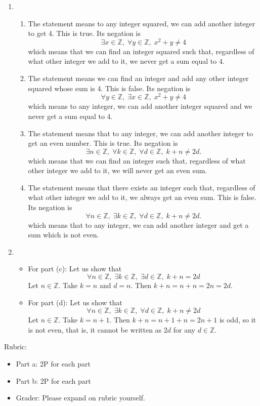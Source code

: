 \documentclass{article}
\newcommand{\Z}{\mathbb{Z}}
\theoremstyle{definition}
\begin{document}
\begin{solution}
\begin{enumerate}
	\item 
	\begin{enumerate}
		\item The statement means to any integer squared, we can add another integer to get 4. This is true. Its negation is
		\[
		\exists x \in \Z, \; \forall y \in \Z, \; x^2 + y \neq 4
		\]
		which means that we can find an integer squared such that, regardless of what other integer we add to it, we never get a sum equal to 4. 
		
		\item The statement means we can find an integer and add any other integer squared whose sum is 4. This is false. Its negation is
		\[
		\forall y \in \Z, \; \exists x \in \Z, \; x^2 + y \neq 4
		\]
		which means to any integer, we can add another integer squared and we never get a sum equal to 4.
		
		
		\item The statement means that to any integer, we can add another integer to get an even number. This is true. Its negation is
		\[
		\exists n \in \Z, \; \forall k \in \Z, \; \forall d \in \Z, \; k + n \neq 2d.
		\]
		which means that we can find an integer such that, regardless of what other integer we add to it, we will never get an  even sum.
		
		\item The statement means that there exists an integer such that, regardless of what other integer we add to it, we always get an even sum. This is false. Its negation is
		\[
		\forall n \in \Z, \; \exists k \in \Z, \; \forall d \in \Z, \; k + n \neq 2d.
		\]
		which means that to any integer, we can add another integer and get a sum which is not even.
		
	\end{enumerate}
	\item \begin{itemize}
		\item For part (c): Let us show that
		\[
		\forall n \in \Z, \; \exists k \in \Z, \; \exists d \in \Z, \; k + n = 2d
		\]
		Let $n \in \Z$. Take $k = n$ and $d = n$. Then $k+n = n + n = 2n = 2d$.
		
		\item For part (d): Let us show that
		\[
		\forall n \in \Z, \; \exists k \in \Z, \; \forall d \in \Z, \; k + n \neq 2d
		\]
		Let $n \in \Z$. Take $k = n + 1$. Then $k + n = n+1+n = 2n + 1$ is odd, so it is not even, that is, it cannot be written as $2d$ for any $d \in \Z$.
		
	\end{itemize}
	
\end{enumerate}

{\color{red} Rubric:
\begin{itemize}
\item Part a: 2P for each part
\item Part b: 2P for each part
\item Grader: Please expand on rubric yourself.
\end{itemize}}
\end{solution}
\end{document}
